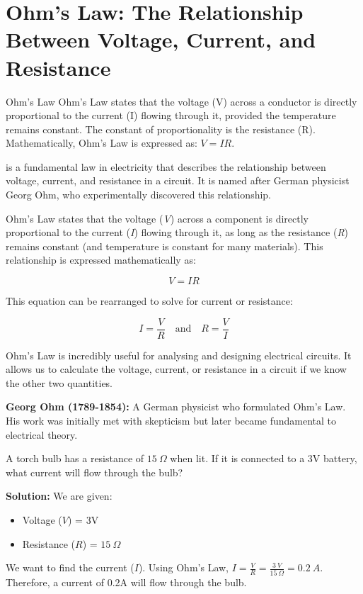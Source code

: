 \section{Ohm's Law: The Relationship Between Voltage, Current, and Resistance}

\begin{keyconcept}{Ohm's Law}
Ohm's Law states that the voltage (V) across a conductor is directly proportional to the current (I) flowing through it, provided the temperature remains constant.  The constant of proportionality is the resistance (R).  Mathematically, Ohm's Law is expressed as: $V = IR$. 
\end{keyconcept}

 is a fundamental law in electricity that describes the relationship between voltage, current, and resistance in a circuit. It is named after German physicist Georg Ohm, who experimentally discovered this relationship.

Ohm's Law states that the voltage (\textit{V}) across a component is directly proportional to the current (\textit{I}) flowing through it, as long as the resistance (\textit{R}) remains constant (and temperature is constant for many materials). This relationship is expressed mathematically as:

$$V = IR$$

This equation can be rearranged to solve for current or resistance:

$$I = \frac{V}{R} \quad \text{and} \quad R = \frac{V}{I}$$

Ohm's Law is incredibly useful for analysing and designing electrical circuits. It allows us to calculate the voltage, current, or resistance in a circuit if we know the other two quantities.

\begin{marginnote}
\textbf{Georg Ohm (1789-1854):} A German physicist who formulated Ohm's Law. His work was initially met with skepticism but later became fundamental to electrical theory. 
\end{marginnote}

\begin{example}
A torch bulb has a resistance of $15\ \Omega$ when lit. If it is connected to a 3V battery, what current will flow through the bulb?

\textbf{Solution:}
We are given:
\begin{itemize}
    \item Voltage ($V$) = 3V
    \item Resistance ($R$) = $15\ \Omega$
\end{itemize}
We want to find the current ($I$). Using Ohm's Law, $I = \frac{V}{R} = \frac{3\ V}{15\ \Omega} = 0.2\ A$.
Therefore, a current of 0.2A will flow through the bulb.
\end{example}

